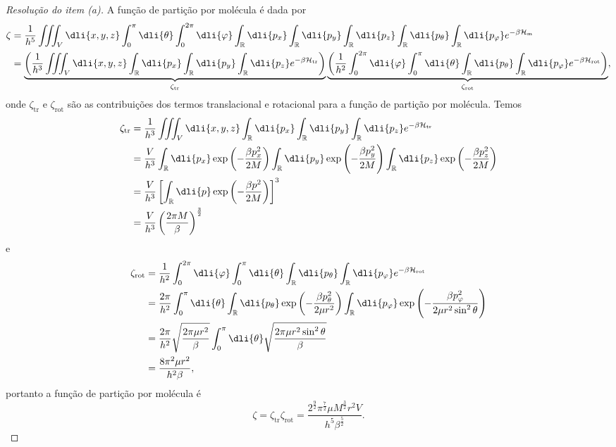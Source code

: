 \begin{proof}[Resolução do item (a)]
    A função de partição por molécula é dada por
    \begin{align*}
        \zeta &= \frac{1}{h^5}\iiint_V \dli{x,y,z} \int_0^{\pi}\dli{\theta}\int_0^{2\pi} \dli{\varphi} \int_{\mathbb{R}}\dli{p_x}\int_{\mathbb{R}} \dli{p_y} \int_{\mathbb{R}}\dli{p_z}\int_{\mathbb{R}}\dli{p_\theta} \int_{\mathbb{R}}\dli{p_{\varphi}} e^{-\beta \mathcal{H}_{\mathrm{m}}}\\
              &= \underbrace{\left(\frac{1}{h^3}\iiint_V \dli{x,y,z}\int_{\mathbb{R}}\dli{p_x}\int_{\mathbb{R}} \dli{p_y} \int_{\mathbb{R}}\dli{p_z} e^{-\beta \mathcal{H}_{\mathrm{tr}}}\right)}_{\zeta_{\mathrm{tr}}}\underbrace{\left(\frac{1}{h^2}\int_0^{2\pi} \dli{\varphi} \int_0^\pi \dli{\theta} \int_{\mathbb{R}}\dli{p_\theta} \int_{\mathbb{R}}\dli{p_{\varphi}} e^{-\beta \mathcal{H}_{\mathrm{rot}}}\right)}_{\zeta_{\mathrm{rot}}},
    \end{align*}
    onde \(\zeta_{\mathrm{tr}}\) e \(\zeta_{\mathrm{rot}}\) são as contribuições dos termos translacional e rotacional para a função de partição por molécula. Temos
    \begin{align*}
        \zeta_{\mathrm{tr}} &= \frac{1}{h^3}\iiint_V \dli{x,y,z}\int_{\mathbb{R}}\dli{p_x}\int_{\mathbb{R}} \dli{p_y} \int_{\mathbb{R}}\dli{p_z} e^{-\beta \mathcal{H}_{\mathrm{tr}}}\\
                   &= \frac{V}{h^3} \int_{\mathbb{R}}\dli{p_x} \exp\left(-\frac{\beta p_x^2}{2M}\right) \int_{\mathbb{R}}\dli{p_y}\exp\left(-\frac{\beta p_y^2}{2M}\right)\int_{\mathbb{R}}\dli{p_z}\exp\left(-\frac{\beta p_z^2}{2M}\right)\\
                   &= \frac{V}{h^3} \left[\int_{\mathbb{R}}\dli{p} \exp\left(-\frac{\beta p^2}{2M}\right)\right]^3\\
                   &= \frac{V}{h^3}\left(\frac{2\pi M}{\beta}\right)^{\frac32}
    \end{align*}
    e
    \begin{align*}
        \zeta_{\mathrm{rot}} &= \frac{1}{h^2}\int_0^{2\pi} \dli{\varphi} \int_0^\pi \dli{\theta} \int_{\mathbb{R}}\dli{p_\theta} \int_{\mathbb{R}}\dli{p_{\varphi}} e^{-\beta \mathcal{H}_{\mathrm{rot}}}\\
                    &= \frac{2\pi}{h^2} \int_0^\pi \dli{\theta} \int_{\mathbb{R}} \dli{p_\theta} \exp\left(-\frac{\beta p_\theta^2}{2\mu r^2}\right) \int_{\mathbb{R}} \dli{p_{\varphi}} \exp\left(-\frac{\beta p_{\varphi}^2}{2\mu r^2 \sin^2\theta}\right)\\
                    &= \frac{2\pi}{h^2} \sqrt{\frac{2\pi\mu r^2}{\beta}} \int_0^\pi \dli{\theta} \sqrt{\frac{2\pi\mu r^2 \sin^2\theta}{\beta}}\\
                    &= \frac{8\pi^2 \mu r^2}{h^2 \beta},
    \end{align*}
    portanto a função de partição por molécula é
    \begin{equation*}
        \zeta = \zeta_{\mathrm{tr}}\zeta_{\mathrm{rot}} = \frac{2^{\frac92}\pi^{\frac72}\mu M^{\frac32} r^2V}{h^5 \beta^{\frac52}}.
    \end{equation*}


\end{proof}
